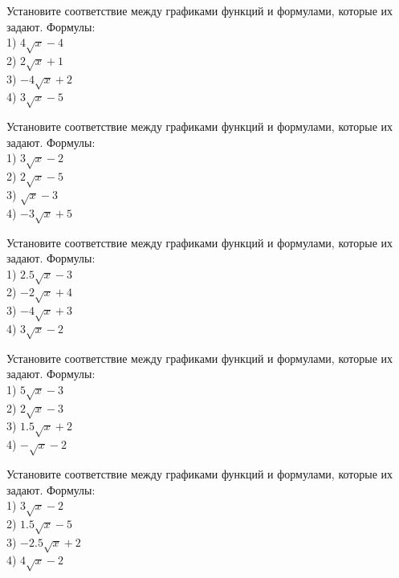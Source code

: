 \documentclass[4apaper]{article}
\begin{document}
\begin{taskBN}{26}
Установите соответствие между графиками функций и формулами, которые их задают. Формулы: \\1) $4\sqrt{x}-4$\\2) $2\sqrt{x}+1$\\3) $-4\sqrt{x}+2$\\4) $3\sqrt{x}-5$
\end{taskBN}

\begin{taskBN}{27}
Установите соответствие между графиками функций и формулами, которые их задают. Формулы: \\1) $3\sqrt{x}-2$\\2) $2\sqrt{x}-5$\\3) $\sqrt{x}-3$\\4) $-3\sqrt{x}+5$
\end{taskBN}

\begin{taskBN}{28}
Установите соответствие между графиками функций и формулами, которые их задают. Формулы: \\1) $2.5\sqrt{x}-3$\\2) $-2\sqrt{x}+4$\\3) $-4\sqrt{x}+3$\\4) $3\sqrt{x}-2$
\end{taskBN}

\begin{taskBN}{29}
Установите соответствие между графиками функций и формулами, которые их задают. Формулы: \\1) $5\sqrt{x}-3$\\2) $2\sqrt{x}-3$\\3) $1.5\sqrt{x}+2$\\4) $-\sqrt{x}-2$
\end{taskBN}

\begin{taskBN}{30}
Установите соответствие между графиками функций и формулами, которые их задают. Формулы: \\1) $3\sqrt{x}-2$\\2) $1.5\sqrt{x}-5$\\3) $-2.5\sqrt{x}+2$\\4) $4\sqrt{x}-2$
\end{taskBN}
\end{document}
